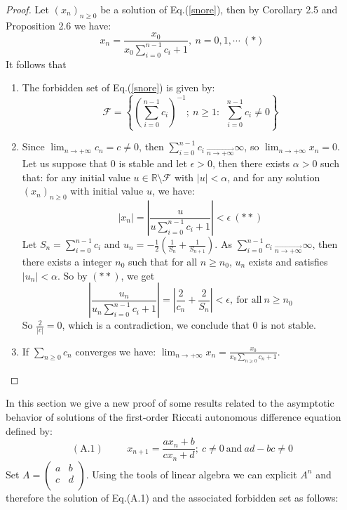 \documentclass[11pt]{amsart}
\theoremstyle{definition}
\theoremstyle{remark}
\theoremstyle{example}
\numberwithin{equation}{section}
\begin{document}
\begin{proof}\rm{
 Let $(x_n)_{n\geq0}$ be a solution of Eq.(\ref{snore}), then by Corollary 2.5 and Proposition 2.6 we have:
$$x_n=\frac{x_0}{x_0\sum\limits_{i=0}^{n-1}c_i+1}, \ n=0,1,\cdots \ (*)$$
It follows that
\begin{enumerate}[leftmargin=*]
\item The forbidden set of Eq.(\ref{snore}) is given by:
$$\mathcal{F}=\left\{\left(\sum\limits_{i=0}^{n-1}c_i\right)^{-1}; \ n\geq1: \
\ \sum\limits_{i=0}^{n-1}c_i\neq0\right\}$$
\item Since $\displaystyle{\lim_{n\rightarrow+\infty}c_n=c\neq0}$, then $\sum\limits_{i=0}^{n-1}c_i\ _ { \overrightarrow{n\rightarrow+\infty}}\infty$, so $\displaystyle{\lim_{n\rightarrow+\infty}x_n=0}$.\\Let us suppose that 0 is stable and let $\epsilon>0$, then there exists $\alpha>0$ such that: for any initial value $u \in \mathbb{R}\setminus\mathcal{F}$ with $\mid u\mid<\alpha$, and for any solution $(x_n)_{n\geq0}$ with initial value $u$, we have:
$$\mid x_n\mid=\left|\frac{u}{u\sum\limits_{i=0}^{n-1}c_i+1}\right|<\epsilon \  (**)$$
Let $S_n=\sum\limits_{i=0}^{n-1}c_i$ and $u_n=-\displaystyle{\frac{1}{2}(\frac{1}{S_n}+\frac{1}{S_{n+1}})}$. As $\sum\limits_{i=0}^{n-1}c_i\ _ { \overrightarrow{n\rightarrow+\infty}}\infty$, then there exists a integer $n_0$ such that for all $n\geq n_0$, $u_n$ exists and satisfies $|u_n|<\alpha$. So by $(**)$, we get
$$\left|\frac{u_n}{u_n\sum\limits_{i=0}^{n-1}c_i+1}\right|=
\left|\frac{2}{c_n}+\frac{2}{S_n}\right|<\epsilon, \ \text{for all} \ n\geq n_0$$
So $\frac{2}{|c|}=0$, which is a contradiction, we conclude that 0 is not stable.
\item If $\displaystyle{\sum_{n\geq0}c_n}$ converges we have: $\displaystyle{\lim_{n\rightarrow+\infty}x_n=\frac{x_0}{x_0\sum\limits_{n\geq0}c_n+1}}$.
\end{enumerate}

}\end{proof}
\medskip

\noindent
\hspace{2mm} In this section we give a new proof of some results related to the asymptotic behavior of solutions of the first-order Riccati
autonomous difference equation defined by:
\begin{equation*}(\text{A.1}) \hspace{1cm} x_{n+1}=\frac{ax_n+b}{cx_n+d}; \ c\neq0 \ \text{and} \ ad-bc\neq0 \label{re}
\end{equation*}\noindent Set $A=\left(\begin{array}{cc}
a & b\\
c & d \\
\end{array}\right)$. Using the tools of linear algebra we can explicit $A^n$ and therefore the solution of Eq.(A.1)
and the associated forbidden set as follows:\\
\noindent
\medskip
\end{document}
